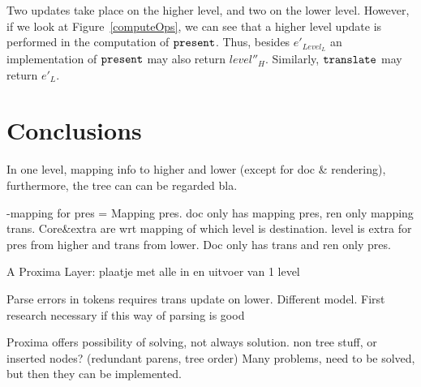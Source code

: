 Two updates take place on the higher level, and two on the lower level. However, if we look at Figure~\ref{computeOps}, we can see that a higher level update is performed in the computation of
 ${\tt present}$. Thus, besides $e'_{Level_{L}}$ an implementation of ${\tt present}$ may also return $level''_{H}$.  Similarly, ${\tt translate}$ may return $e'_{L}$. 



%																
\section{Conclusions}

In one level,  mapping info to higher and lower (except for doc \& rendering), furthermore, the tree can can be regarded bla.

-mapping for pres = Mapping pres. doc only has mapping pres, ren only mapping trans. Core\&extra are wrt mapping of which level is destination. level is extra for pres from higher and trans from lower. Doc only has trans  and ren only pres.



A Proxima Layer:
plaatje met alle in en uitvoer van 1 level


Parse errors in tokens requires trans update on lower. Different model. First research necessary if this way of parsing is good

Proxima offers possibility of solving, not always solution. non tree stuff, or inserted nodes? (redundant parens, tree order) Many problems, need to be solved, but then they can be implemented.




%																
%																
%																
%
%



%																
%																
%																
%
%
%
